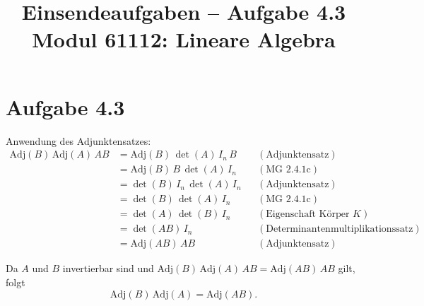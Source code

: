 \documentclass[a4paper,12pt]{article}
\title{Einsendeaufgaben -- Aufgabe 4.3\\[0.5em]
\large Modul 61112: Lineare Algebra}
\author{}
\date{}
\begin{document}
\maketitle

\section*{Aufgabe 4.3}

Anwendung des Adjunktensatzes:
\begin{align*}
  \mathrm{Adj}(B)\, \mathrm{Adj}(A)\, AB
    &= \mathrm{Adj}(B)\, \det(A)\, I_n\, B && (\text{Adjunktensatz}) \\
    &= \mathrm{Adj}(B)\, B\, \det(A)\, I_n && (\text{MG 2.4.1c}) \\
    &= \det(B)\, I_n\, \det(A)\, I_n && (\text{Adjunktensatz}) \\
    &= \det(B)\, \det(A)\, I_n && (\text{MG 2.4.1c}) \\
    &= \det(A)\, \det(B)\, I_n && (\text{Eigenschaft Körper } K) \\
    &= \det(AB)\, I_n && (\text{Determinantenmultiplikationssatz}) \\
    &= \mathrm{Adj}(AB)\, AB && (\text{Adjunktensatz})
\end{align*}

Da $A$ und $B$ invertierbar sind und $\mathrm{Adj}(B)\, \mathrm{Adj}(A)\, AB = \mathrm{Adj}(AB)\, AB$ gilt, folgt
\[
  \mathrm{Adj}(B)\, \mathrm{Adj}(A) = \mathrm{Adj}(AB).
\]
\end{document}
